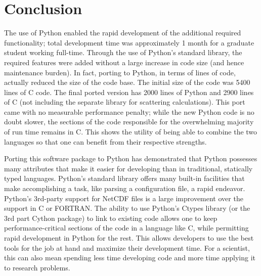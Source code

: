 \documentclass[twocolumn]{article}
\begin{document}
\section{Conclusion}
The use of Python enabled the rapid development of the additional required
functionality; total development time was approximately 1 month for a graduate
student working full-time. Through the use of Python's standard library, the required
features were added without a large increase in code size (and hence maintenance
burden).  In fact, porting to Python, in terms of lines of code, actually reduced
the size of the code base. The initial size of the code was 5400 lines of C code.
The final ported version has 2000 lines of Python and 2900 lines of C (not including
the separate library for scattering calculations). This port came with no measurable
performance penalty; while the new Python code is no doubt slower, the sections of
the code responsible for the overwhelming majority of run time remains in C.
This shows the utility of being able to combine the two languages so that one
can benefit from their respective strengths.

Porting this software package to Python has demonstrated that Python possesses
many attributes that make it easier for developing than in traditional, statically
typed languages. Python's standard library offers many built-in facilities that
make accomplishing a task, like parsing a configuration file, a rapid endeavor.
Python's 3rd-party support for NetCDF files is a large improvement over the
support in C or FORTRAN.  The ability to use Python's Ctypes library (or the
3rd part Cython package) to link to existing code allows one to keep
performance-critical sections of the code in a language like C, while permitting
rapid development in Python for the rest. This allows developers to use the best
tools for the job at hand and maximize their development time. For a scientist,
this can also mean spending less time developing code and more time applying
it to research problems.

\end{document}
